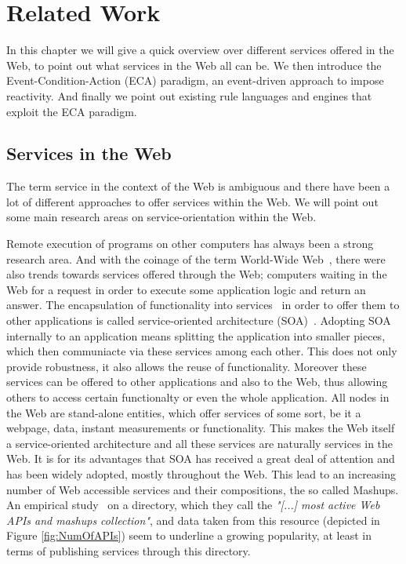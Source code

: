 
\chapter{Related Work}

In this chapter we will give a quick overview over different services offered in the Web, to point out what services in the Web all can be.
We then introduce the Event-Condition-Action (\textrm{ECA}) paradigm, an event-driven approach to impose reactivity.
And finally we point out existing rule languages and engines that exploit the \textrm{ECA} paradigm.

\section{Services in the Web}

The term service in the context of the Web is ambiguous and there have been a lot of different approaches to offer services within the Web.
We will point out some main research areas on service-orientation within the Web.

Remote execution of programs on other computers has always been a strong research area. And with the coinage of the term \textrm{World-Wide Web}~\cite{DBLP:journals/en/Berners-LeeCGP92}, there were also trends towards services offered through the Web; computers waiting in the Web for a request in order to execute some application logic and return an answer.
The encapsulation of functionality into services~\cite{peltz2003web} in order to offer them to other applications is called service-oriented architecture (\textrm{SOA})~\cite{perrey2003service}.
Adopting \textrm{SOA} internally to an application means splitting the application into smaller pieces, which then communiacte via these services among each other.
This does not only provide robustness, it also allows the reuse of functionality.
Moreover these services can be offered to other applications and also to the Web, thus allowing others to access certain functionalty or even the whole application.
All nodes in the Web are stand-alone entities, which offer services of some sort, be it a webpage, data, instant measurements or functionality.
This makes the Web itself a service-oriented architecture and all these services are naturally services in the Web.
It is for its advantages that \textrm{SOA} has received a great deal of attention and has been widely adopted, mostly throughout the Web.
This lead to an increasing number of Web accessible services and their compositions, the so called \textrm{Mashups}.
An empirical study~\cite{conf/icws/HuangFT12} on a directory, which they call the \textit{"[...] most active Web APIs and mashups collection"}, and data taken from this resource (depicted in Figure \ref{fig:NumOfAPIs}) seem to underline a growing popularity, at least in terms of publishing services through this directory.

